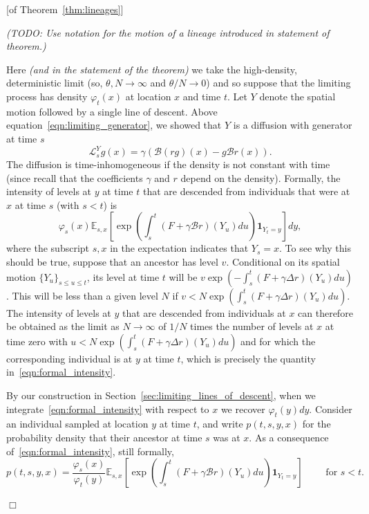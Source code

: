 \documentclass[12pt]{article}
\newenvironment {proof}{{\noindent\bf Proof }}{\hfill $\Box$ \medskip}
\newcommand{\IE}{\mathbb E}
\newcommand{\ind}{\mathbf{1}}
\newcommand{\DG}{\mathcal{B}}  %
\newcommand{\comment}[1]{{\color{blue} \it #1}}
\begin{document}
\begin{proof}[of Theorem~\ref{thm:lineages}]

\comment{(TODO: Use notation for the motion of a lineage introduced in statement of theorem.)}

Here
\comment{(and in the statement of the theorem)}
we take the high-density, deterministic limit
(so, $\theta, N \to \infty$ and $\theta/N \to 0$)
and so suppose that the limiting process has density $\varphi_t(x)$
at location $x$ and time $t$.
Let $Y$ denote the spatial motion followed by a single line of descent.
Above equation~\eqref{eqn:limiting_generator},
we showed that $Y$ is a diffusion with generator at time $s$
$$
    \mathcal{L}^Y_s g(x) = \gamma ( \DG(rg)(x) - g \DG r(x) ) .
$$
The diffusion is time-inhomogeneous if the density is not constant with time
(since recall that the coefficients $\gamma$ and $r$ depend on the density).
Formally, the intensity of levels at $y$ at time $t$
that are descended from individuals that were at $x$ at time $s$
(with $s < t$) is
\begin{equation} \label{eqn:formal_intensity}
    \varphi_s(x) \IE_{s,x} \left[
        \exp\left(
            \int_s^t (F + \gamma \DG r)(Y_u) du
        \right)
        \ind_{Y_t = y}
    \right]
    dy ,
\end{equation}
where the subscript $s, x$ in the expectation indicates that $Y_s = x$.
To see why this should be true, 
suppose that an ancestor has level $v$. Conditional on its 
spatial motion $\{Y_u\}_{s\leq u\leq t}$, its level at time $t$ will
be $v \exp(-\int_s^t(F+\gamma\Delta r)(Y_u)du)$. This will be less than a given level 
$N$ if $v < N \exp(\int_s^t(F+\gamma\Delta r)(Y_u)du)$. 
The intensity of levels at $y$ that are descended from individuals at
$x$ can therefore be obtained as the limit as $N\to\infty$ of 
$1/N$ times the number of levels at $x$ at time zero with
$u<N \exp(\int_s^t(F+\gamma\Delta r)(Y_u)du)$ and for which
the corresponding individual is at $y$ at time $t$, which is 
precisely the quantity in~\eqref{eqn:formal_intensity}. 

By our construction in Section~\ref{sec:limiting_lines_of_descent},
when we integrate~\eqref{eqn:formal_intensity}
with respect to $x$ we recover $\varphi_t(y)dy$. 
Consider an individual sampled at location $y$ at time $t$,
and write $p(t,s,y,x)$ for the probability density
that their ancestor at time $s$ was at $x$.
As a consequence of~\eqref{eqn:formal_intensity},
still formally,
\begin{equation}
\label{eqn:ptsyx}
    p(t,s,y,x)
    =
    \frac{\varphi_s(x)}{\varphi_t(y)}
    \IE_{s,x}\left[
        \exp\left( \int_s^t (F + \gamma\DG r)(Y_u) du \right)
        \ind_{Y_t=y}
    \right]
\qquad \text{ for } s < t.
\end{equation}


\end{proof}
\end{document}
